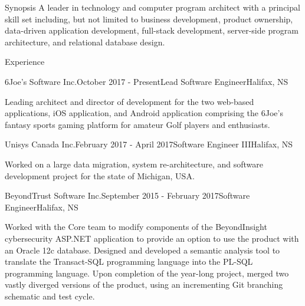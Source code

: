 \documentclass{resume} %
\begin{document}
\begin{rSection}{Synopsis}
A leader in technology and computer program architect with a principal skill set including, but not limited to business development, product ownership, data-driven application development, full-stack development, server-side program architecture, and relational database design.
\end{rSection}


\begin{rSection}{Experience}

\begin{rSubsection}{6Joe's Software Inc.}{October 2017 - Present}{Lead Software Engineer}{Halifax, NS}

\item[] Leading architect and director of development for the two web-based applications, iOS application, and Android application comprising the 6Joe's fantasy sports gaming platform for amateur Golf players and enthusiasts.

\end{rSubsection}


\begin{rSubsection}{Unisys Canada Inc.}{February 2017 - April 2017}{Software Engineer III}{Halifax, NS}

\item[] Worked on a large data migration, system re-architecture, and software development project for the state of Michigan, USA.

\end{rSubsection}


\begin{rSubsection}{BeyondTrust Software Inc.}{September 2015 - February 2017}{Software Engineer}{Halifax, NS}

\item[] Worked with the Core team to modify components of the BeyondInsight cybersecurity ASP.NET application to provide an option to use the product with an Oracle 12c database. Designed and developed a semantic analysis tool to translate the Transact-SQL programming language into the PL-SQL programming language. Upon completion of the year-long project, merged two vastly diverged versions of the product, using an incrementing Git branching schematic and test cycle.


\end{rSubsection}
\end{rSection}
\end{document}
